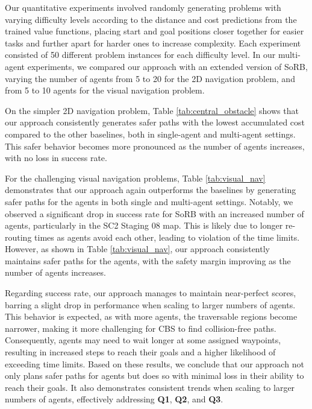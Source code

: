 \documentclass[letterpaper, 10 pt, conference]{IEEEConference}
\begin{document}
Our quantitative experiments involved randomly generating problems with varying difficulty levels according to the distance and cost predictions from the trained value functions, placing start and goal positions closer together for easier tasks and further apart for harder ones to increase complexity. Each experiment consisted of 50 different problem instances for each difficulty level. In our multi-agent experiments, we compared our approach with an extended version of SoRB, varying the number of agents from 5 to 20 for the 2D navigation problem, and from 5 to 10 agents for the visual navigation problem.

On the simpler 2D navigation problem, Table \ref{tab:central_obstacle} shows that our approach consistently generates safer paths with the lowest accumulated cost compared to the other baselines, both in single-agent and multi-agent settings. This safer behavior becomes more pronounced as the number of agents increases, with no loss in success rate.

For the challenging visual navigation problems, Table \ref{tab:visual_nav} demonstrates that our approach again outperforms the baselines by generating safer paths for the agents in both single and multi-agent settings. Notably, we observed a significant drop in success rate for SoRB with an increased number of agents, particularly in the SC2 Staging 08 map. This is likely due to longer re-routing times as agents avoid each other, leading to violation of the time limits. However, as shown in Table \ref{tab:visual_nav}, our approach consistently maintains safer paths for the agents, with the safety margin improving as the number of agents increases.

Regarding success rate, our approach manages to maintain near-perfect scores, barring a slight drop in performance when scaling to larger numbers of agents. This behavior is expected, as with more agents, the traversable regions become narrower, making it more challenging for CBS to find collision-free paths. Consequently, agents may need to wait longer at some assigned waypoints, resulting in increased steps to reach their goals and a higher likelihood of exceeding time limits. Based on these results, we conclude that our approach not only plans safer paths for agents but does so with minimal loss in their ability to reach their goals. It also demonstrates consistent trends when scaling to larger numbers of agents, effectively addressing \textbf{Q1}, \textbf{Q2}, and \textbf{Q3}.
\end{document}
